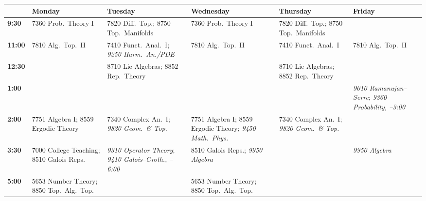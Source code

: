 \documentclass[8pt,landscape]{extarticle}
\newcommand{\GridRoom}[1]{}
\newcommand{\GridRoom}[1]{ (#1)}
\begin{document}
\small
\setlength{\tabcolsep}{3.8pt}
\renewcommand{\arraystretch}{1.05}
\begin{tabular}{@{}>{\bfseries}p{0.55in}
  p{1.85in} p{1.85in} p{1.85in} p{1.85in} p{1.85in}@{}}
\hline
& \textbf{Monday} & \textbf{Tuesday} & \textbf{Wednesday} & \textbf{Thursday}
& \textbf{Friday}\\
\hline
9:30 & 7360 Prob.\ Theory I\GridRoom{} &
  7820 Diff.\ Top.\GridRoom{};
  8750 Top.\ Manifolds\GridRoom{} &
  7360 Prob.\ Theory I\GridRoom{}
  & 7820 Diff.\ Top.; 8750 Top.\ Manifolds & \\
11:00 & 7810 Alg.\ Top.\ II\GridRoom{} &
  7410 Funct.\ Anal.\ I\GridRoom{};
  \textit{9250 Harm.\ An./PDE\GridRoom{}}
  & 7810 Alg.\ Top.\ II\GridRoom{} & 7410 Funct.\ Anal.\ I
  & 7810 Alg.\ Top.\ II\GridRoom{}\\
12:30 & & 8710 Lie Algebras\GridRoom{};
  8852 Rep.\ Theory\GridRoom{} & &
  8710 Lie Algebras; 8852 Rep.\ Theory & \\
1:00 & & & & & \textit{9010 Ramanujan--Serre\GridRoom{}};
  \textit{9360 Probability, --3:00\GridRoom{}}\\
2:00 & 7751 Algebra I\GridRoom{};
  8559 Ergodic Theory\GridRoom{}
  & 7340 Complex An.\ I\GridRoom{};
  \textit{9820 Geom.\ \& Top.\GridRoom{}}
  & 7751 Algebra I; 8559 Ergodic Theory;
  \textit{9450 Math.\ Phys.\GridRoom{}}
  & 7340 Complex An.\ I; \textit{9820 Geom.\ \& Top.} & \\
3:30 & 7000 College Teaching\GridRoom{};
  8510 Galois Reps.\GridRoom{}
  & \textit{9310 Operator Theory\GridRoom{}};
    \textit{9410 Galois--Groth., --6:00\GridRoom{}}
  & 8510 Galois Reps.; \textit{9950 Algebra\GridRoom{}} & &
  \textit{9950 Algebra\GridRoom{}}\\
5:00 & 5653 Number Theory\GridRoom{};
  8850 Top.\ Alg.\ Top.\GridRoom{}
  & & 5653 Number Theory; 8850 Top.\ Alg.\ Top.\ & & \\
\hline
\end{tabular}
\end{document}

